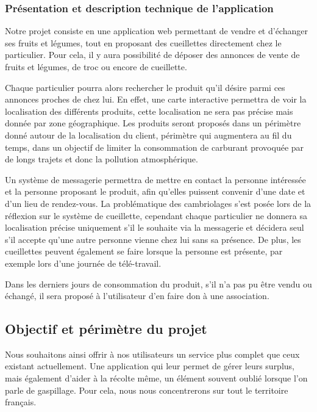 \documentclass{article}
\begin{document}
\subsubsection{Présentation et description technique de l'application}

Notre projet consiste en une application web permettant de vendre et d'échanger ses fruits et légumes, tout en proposant des cueillettes directement chez le particulier. Pour cela, il y aura possibilité de déposer des annonces de vente de fruits et légumes, de troc ou encore de cueillette. 

Chaque particulier pourra alors rechercher le produit qu'il désire parmi ces annonces proches de chez lui. En effet, une carte interactive permettra de voir la localisation des différents produits, cette localisation ne sera pas précise mais donnée par zone géographique. Les produits seront proposés dans un périmètre donné autour de la localisation du client, périmètre qui augmentera au fil du temps, dans un objectif de limiter la consommation de carburant provoquée par de longs trajets et donc la pollution atmosphérique. 

Un système de messagerie permettra de mettre en contact la personne intéressée et la personne proposant le produit, afin qu'elles puissent convenir d'une date et d'un lieu de rendez-vous. 
La problématique des cambriolages s'est posée lors de la réflexion sur le système de cueillette, cependant chaque particulier ne donnera sa localisation précise uniquement s'il le souhaite via la messagerie et décidera seul s'il accepte qu'une autre personne vienne chez lui sans sa présence. De plus, les cueillettes peuvent également se faire lorsque la personne est présente, par exemple lors d'une journée de télé-travail.

Dans les derniers jours de consommation du produit, s'il n'a pas pu être vendu ou échangé, il sera proposé à l'utilisateur d'en faire don à une association. 

\subsection{Objectif et périmètre du projet}

Nous souhaitons ainsi offrir à nos utilisateurs un service plus complet que ceux existant actuellement. Une application qui leur permet de gérer leurs surplus, mais également d'aider à la récolte même, un élément souvent oublié lorsque l'on parle de gaspillage.
Pour cela, nous nous concentrerons sur tout le territoire français.
\end{document}
